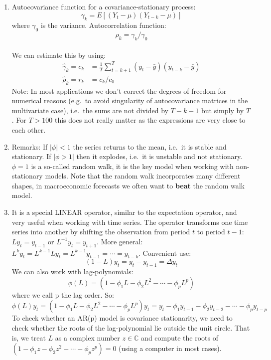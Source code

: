 \begin{enumerate}
\item
Autocovariance function for a covariance-stationary process:
\[\gamma_k = E[(Y_t - \mu)(Y_{t-k}-\mu)]\]
where \(\gamma_0\) is the variance. Autocorrelation function: \[\rho_k = \gamma_k/\gamma_0\]
\\
We can estimate this by using:
\begin{align*}
\hat{\gamma}_k = c_k &= \frac{1}{T} \sum_{t=k+1}^T(y_t -\bar{y})(y_{t-k}-\bar{y})
\\
\hat{\rho}_k = r_k & = c_k/c_0
\end{align*}
Note: In most applications we don't correct the degrees of freedom for numerical reasons
  (e.g.\ to avoid singularity of autocovariance matrices in the multivariate case),
  i.e.\ the sums are not divided by \(T-k-1\) but simply by \(T\).
For \(T>100\) this does not really matter as the expressions are very close to each other.

\item

Remarks: If \(|\phi|<1\) the series returns to the mean, i.e.\ it is stable and stationary.
If \(|\phi>1|\) then it explodes, i.e.\ it is unstable and not stationary.
\(\phi=1\) is a so-called random walk,
  it is the key model when working with non-stationary models.
Note that the random walk incorporates many different shapes, in macroeconomic forecasts we often want to \textbf{beat} the random walk model.
\item It is a special LINEAR operator, similar to the expectation operator, and very useful when working with time series.
The operator transforms one time series into another by shifting the observation from period \(t\) to period \(t-1\):
\(Ly_t = y_{t-1}\) or \(L^{-1} y_t =y_{t+1}\).
More general: \(L^k y_t = L^{k-1} L y_t = L^{k-1} y_{t-1} = \cdots  = y_{t-k}\).
Convenient use:
\[(1-L)y_t = y_t - y_{t-1}= \Delta y_t\]
We can also work with lag-polynomials:
\[ \phi(L) = (1-\phi_1 L-\phi_2 L^2 -\cdots  - \phi_p L^p)\]
where we call p the lag order. So:
\[ \phi(L) y_t = (1-\phi_1 L-\phi_2 L^2 -\cdots  - \phi_p L^p)y_t = y_t - \phi_1 y_{t-1} -\phi_2 y_{t-2} - \cdots  - \phi_p y_{t-p}\]
To check whether an {AR{(p)}} model is covariance stationarity, we need to check whether the roots of the lag-polynomial lie outside the unit circle.
That is, we treat \(L\) as a complex number \(z\in \mathbb{C}\) and compute the roots of \((1-\phi_1 z-\phi_2 z^2 -\cdots  - \phi_p z^p)=0\) (using a computer in most cases).


\end{enumerate}
